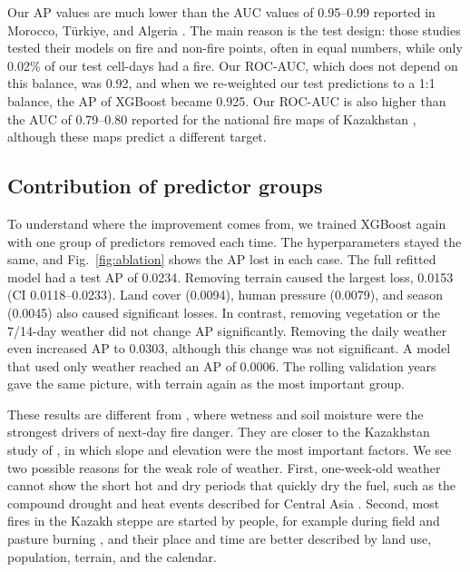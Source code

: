 Our AP values are much lower than the AUC values of 0.95--0.99 reported in Morocco, T\"urkiye, and Algeria \cite{jadouli2024morocco,ouazri2026catboost,iban2024shap,bouzeraa2025wsm}. The main reason is the test design: those studies tested their models on fire and non-fire points, often in equal numbers, while only 0.02\% of our test cell-days had a fire. Our ROC-AUC, which does not depend on this balance, was 0.92, and when we re-weighted our test predictions to a 1:1 balance, the AP of XGBoost became 0.925. Our ROC-AUC is also higher than the AUC of 0.79--0.80 reported for the national fire maps of Kazakhstan \cite{chepashev2025maxent,babu2025sfri}, although these maps predict a different target.

\subsection{Contribution of predictor groups}\label{sec:res_ablation}

To understand where the improvement comes from, we trained XGBoost again with one group of predictors removed each time. The hyperparameters stayed the same, and Fig.~\ref{fig:ablation} shows the AP lost in each case. The full refitted model had a test AP of 0.0234. Removing terrain caused the largest loss, 0.0153 (CI 0.0118--0.0233). Land cover (0.0094), human pressure (0.0079), and season (0.0045) also caused significant losses. In contrast, removing vegetation or the 7/14-day weather did not change AP significantly. Removing the daily weather even increased AP to 0.0303, although this change was not significant. A model that used only weather reached an AP of 0.0006. The rolling validation years gave the same picture, with terrain again as the most important group.

These results are different from \cite{kondylatos2022danger}, where wetness and soil moisture were the strongest drivers of next-day fire danger. They are closer to the Kazakhstan study of \cite{babu2025sfri}, in which slope and elevation were the most important factors. We see two possible reasons for the weak role of weather. First, one-week-old weather cannot show the short hot and dry periods that quickly dry the fuel, such as the compound drought and heat events described for Central Asia \cite{ding2026vegetation}. Second, most fires in the Kazakh steppe are started by people, for example during field and pasture burning \cite{jones2022fireclimate,chepashev2025maxent}, and their place and time are better described by land use, population, terrain, and the calendar.

